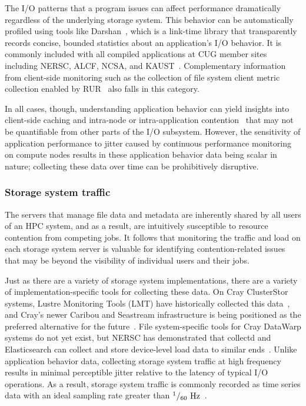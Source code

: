 The I/O patterns that a program issues can affect performance dramatically regardless of the underlying storage system.
This behavior can be automatically profiled using tools like Darshan~\cite{Carns2009}, which is a link-time library that transparently records concise, bounded statistics about an application's I/O behavior.  
It is commonly included with all compiled applications at CUG member sites including NERSC, ALCF, NCSA, and KAUST~\cite{Lockwood2017,Luu:2015:HPDC,Hadri2015,White2017}.
Complementary information from client-side monitoring  such as the collection of file system client metric collection enabled by RUR~\cite{Butler2014} also falls in this category.

In all cases, though, understanding application behavior can yield insights into client-side caching and intra-node or intra-application contention~\cite{Lofstead2010} that may not be quantifiable from other parts of the I/O subsystem.
However, the sensitivity of application performance to jitter caused by continuous performance monitoring on compute nodes results in these application behavior data being scalar in nature; collecting these data over time can be prohibitively disruptive.

\subsubsection{Storage system traffic} \label{sec:architecture/components/fs}

The servers that manage file data and metadata are inherently shared by all users of an HPC system, and as a result, are intuitively susceptible to resource contention from competing jobs.
It follows that monitoring the traffic and load on each storage system server is valuable for identifying contention-related issues that may be beyond the visibility of individual users and their jobs.

Just as there are a variety of storage system implementations, there are a variety of implementation-specific tools for collecting these data.
On Cray ClusterStor systems, Lustre Monitoring Tools (LMT) have historically collected this data~\cite{Keopp2014}, and Cray's newer Caribou and Seastream infrastructure is being positioned as the preferred alternative for the future~\cite{Flaskerud2017}.
File system-specific tools for Cray DataWarp systems do not yet exist, but NERSC has demonstrated that collectd and Elasticsearch can collect and store device-level load data to similar ends~\cite{Whitney2016}.
Unlike application behavior data, collecting storage system traffic at high frequency results in minimal perceptible jitter relative to the latency of typical I/O operations.
As a result, storage system traffic is commonly recorded as time series data with an ideal sampling rate greater than ${{^1 / _{60} \textup{ Hz}}}$~\cite{Madireddy2017}.

